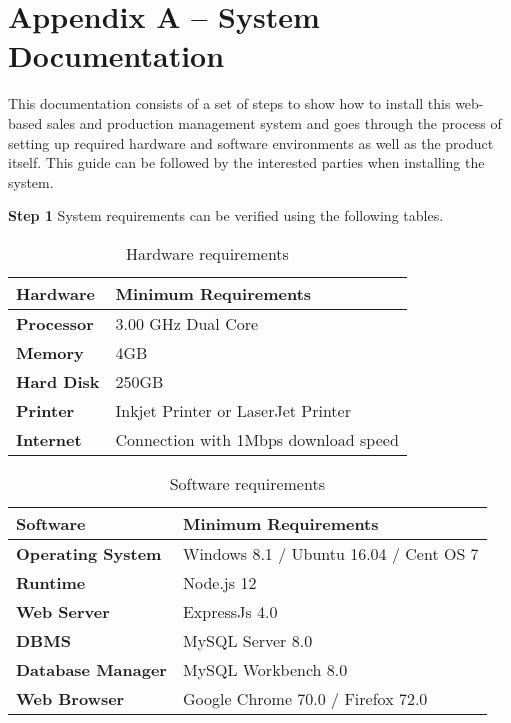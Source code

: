 \documentclass[12pt]{report}
\begin{document}

\renewcommand\thechapter{\Alph{chapter}}
\renewcommand\thesection{\thechapter.\arabic{section}}

\setcounter{chapter}{1}
\setcounter{section}{0}
\setcounter{figure}{0}
\chapter*{Appendix A – System Documentation}
This documentation consists of a set of steps to show how to install this web-based sales and production management system and goes through the process of setting up required hardware and software environments as well as the product itself. This guide can be followed by the interested parties when installing the system.

\noindent
{\large{\bf{Step 1}}}\newline
System requirements can be verified using the following tables.

\begin{table}[H]
	\centering
	\begin{tabular}{ | p{2.5cm} | p{8.5cm} |}
		\hline
		\bf{Hardware}  & \bf{Minimum Requirements}            \\
		\hline
		\bf{Processor} & 3.00 GHz Dual Core                   \\
		\hline
		\bf{Memory}    & 4GB                                  \\
		\hline
		\bf{Hard Disk} & 250GB                                \\
		\hline
		\bf{Printer}   & Inkjet Printer or LaserJet Printer   \\
		\hline
		\bf{Internet}  & Connection with 1Mbps download speed \\
		\hline
	\end{tabular}
	\caption{Hardware requirements}
\end{table}

\begin{table}[H]
	\centering
	\begin{tabular}{ | p{2.5cm} | p{8.5cm} |}
		\hline
		\bf{Software}         & \bf{Minimum Requirements}              \\
		\hline
		\bf{Operating System} & Windows 8.1 / Ubuntu 16.04 / Cent OS 7 \\
		\hline
		\bf{Runtime}          & Node.js 12                             \\
		\hline
		\bf{Web Server}       & ExpressJs  4.0                         \\
		\hline
		\bf{DBMS}             & MySQL Server 8.0                       \\
		\hline
		\bf{Database Manager} & MySQL Workbench 8.0                    \\
		\hline
		\bf{Web Browser}      & Google Chrome 70.0 / Firefox   72.0    \\
		\hline
	\end{tabular}
	\caption{Software requirements}
\end{table}
\end{document}
